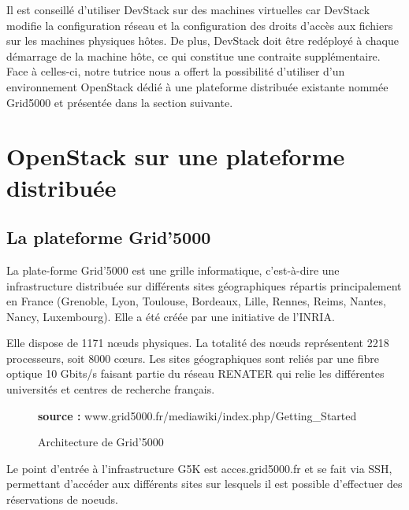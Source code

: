 \documentclass{report}
\begin{document}
    \bigbreak
    
    Il est conseillé d'utiliser DevStack sur des machines virtuelles car DevStack modifie la configuration réseau et la configuration des droits d'accès aux fichiers sur les machines physiques hôtes.\newline
    De plus, DevStack doit être redéployé à chaque démarrage de la machine hôte, ce qui constitue une contraite supplémentaire.\newline
    Face à celles-ci, notre tutrice nous a offert la possibilité d'utiliser d'un environnement OpenStack dédié à une plateforme distribuée existante nommée Grid5000 et présentée dans la section suivante.
    
    \section{OpenStack sur une plateforme distribuée}

		\subsection{La plateforme Grid'5000}

La plate-forme Grid’5000 est une grille informatique, c’est-à-dire une infrastructure distribuée sur différents sites géographiques répartis principalement en France (Grenoble, Lyon, Toulouse, Bordeaux, Lille, Rennes, Reims, Nantes, Nancy, Luxembourg).
Elle a été créée par une initiative de l'INRIA.

\bigbreak

 Elle dispose de 1171 nœuds physiques. La totalité des nœuds représentent 2218 processeurs, soit  8000 cœurs. Les sites géographiques sont reliés par une fibre optique 10 Gbits/s faisant partie du réseau RENATER qui relie les différentes universités et centres de recherche français.
 
 \bigbreak

\begin{figure}[H]
        \caption{Architecture de Grid'5000} 
        \label{grid5000}
        \hspace{\linewidth}
        \textbf{source : }www.grid5000.fr/mediawiki/index.php/Getting\_Started
\end{figure}

Le point d'entrée à l’infrastructure G5K est acces.grid5000.fr et se fait via SSH, permettant d’accéder aux différents sites sur lesquels il est possible d’effectuer des réservations de noeuds.
\bigbreak
\end{document}
